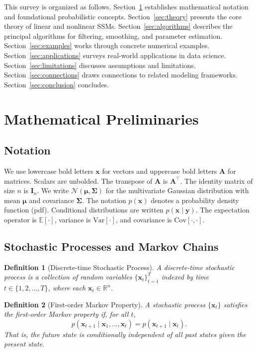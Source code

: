 \documentclass[conference]{IEEEtran}
\newtheorem{definition}{Definition}
\begin{document}
This survey is organized as follows. Section~\ref{sec:prelim} establishes mathematical notation and foundational probabilistic concepts. Section~\ref{sec:theory} presents the core theory of linear and nonlinear SSMs. Section~\ref{sec:algorithms} describes the principal algorithms for filtering, smoothing, and parameter estimation. Section~\ref{sec:examples} works through concrete numerical examples. Section~\ref{sec:applications} surveys real-world applications in data science. Section~\ref{sec:limitations} discusses assumptions and limitations. Section~\ref{sec:connections} draws connections to related modeling frameworks. Section~\ref{sec:conclusion} concludes.

\section{Mathematical Preliminaries}
\label{sec:prelim}

\subsection{Notation}

We use lowercase bold letters $\mathbf{x}$ for vectors and uppercase bold letters $\mathbf{A}$ for matrices. Scalars are unbolded. The transpose of $\mathbf{A}$ is $\mathbf{A}^\top$. The identity matrix of size $n$ is $\mathbf{I}_n$. We write $\mathcal{N}(\boldsymbol{\mu}, \boldsymbol{\Sigma})$ for the multivariate Gaussian distribution with mean $\boldsymbol{\mu}$ and covariance $\boldsymbol{\Sigma}$. The notation $p(\mathbf{x})$ denotes a probability density function (pdf). Conditional distributions are written $p(\mathbf{x} \mid \mathbf{y})$. The expectation operator is $\mathbb{E}[\cdot]$, variance is $\mathrm{Var}[\cdot]$, and covariance is $\mathrm{Cov}[\cdot, \cdot]$.

\subsection{Stochastic Processes and Markov Chains}

\begin{definition}[Discrete-time Stochastic Process]
A discrete-time stochastic process is a collection of random variables $\{\mathbf{x}_t\}_{t=1}^{T}$ indexed by time $t \in \{1, 2, \ldots, T\}$, where each $\mathbf{x}_t \in \mathbb{R}^n$.
\end{definition}

\begin{definition}[First-order Markov Property]
A stochastic process $\{\mathbf{x}_t\}$ satisfies the first-order Markov property if, for all $t$,
\begin{equation}
p(\mathbf{x}_{t+1} \mid \mathbf{x}_1, \ldots, \mathbf{x}_t) = p(\mathbf{x}_{t+1} \mid \mathbf{x}_t).
\end{equation}
That is, the future state is conditionally independent of all past states given the present state.
\end{definition}
\end{document}
